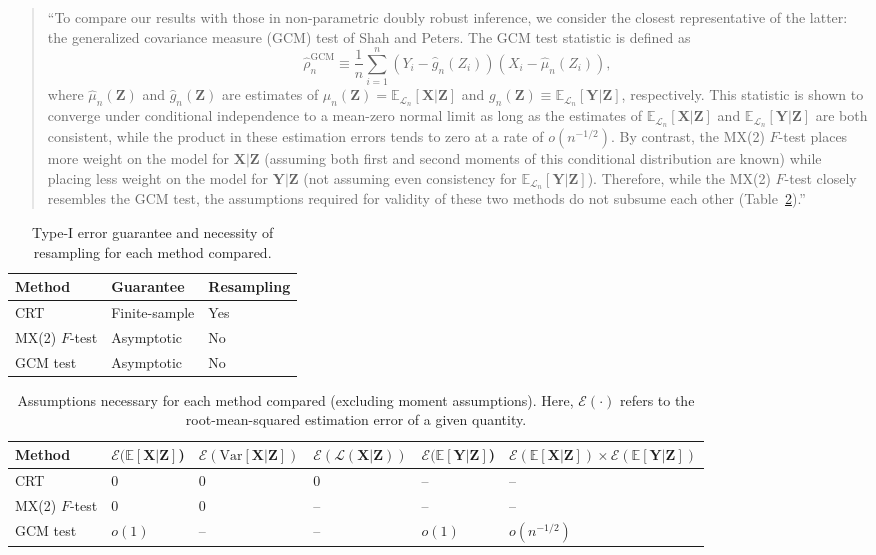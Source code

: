 \documentclass[12pt]{article}
\begin{document}
\begin{enumerate}
\begin{quote}
``To compare our results with those in non-parametric doubly robust inference, we consider the closest representative of the latter: the generalized covariance measure (GCM) test of Shah and Peters. The GCM test statistic is defined as
\begin{equation}
	\widehat \rho^{\text{GCM}}_n \equiv \frac{1}{n}\sum_{i = 1}^n  (Y_i - \widehat g_n(Z_i))(X_i - \widehat \mu_n(Z_i)),
\end{equation}
where $\widehat \mu_n(\bm Z)$ and $\widehat g_n(\bm Z)$ are estimates of $\mu_n(\bm Z) = \mathbb E_{\mathcal L_n}[\bm X|\bm Z]$ and $g_n(\bm Z) \equiv \mathbb E_{\mathcal L_n}[\bm Y|\bm Z]$, respectively. This statistic is shown to converge under conditional independence to a mean-zero normal limit as long as the estimates of $\mathbb E_{\mathcal L_n}[\bm X|\bm Z]$ and $\mathbb E_{\mathcal L_n}[\bm Y|\bm Z]$ are both consistent, while the product in these estimation errors tends to zero at a rate of $o(n^{-1/2})$. By contrast, the MX(2) $F$-test places more weight on the model for $\bm X|\bm Z$ (assuming both first and second moments of this conditional distribution are known) while placing less weight on the model for $\bm Y|\bm Z$ (not assuming even consistency for $\mathbb E_{\mathcal L_n}[\bm Y|\bm Z]$). Therefore, while the MX(2) $F$-test closely resembles the GCM test, the assumptions required for validity of these two methods do not subsume each other (Table~\ref{tab:summary-2}).''
\end{quote}

	\begin{table}[h!]
	\centering
	\begin{tabular}{l|ll}
		Method & Guarantee & Resampling \\
		\hline
		CRT & Finite-sample & Yes \\	
		MX(2) $F$-test & Asymptotic & No  \\
		GCM test & Asymptotic & No
	\end{tabular}
	\caption{Type-I error guarantee and necessity of resampling for each method compared.}
	\label{tab:summary-1}
\end{table}

\begin{table}[h!]
	\small
	\begin{tabular}{l|lllll}
		Method & $\mathcal E(\mathbb E[\bm X|\bm Z]$) & $\mathcal E(\text{Var}[\bm X|\bm Z])$ & $\mathcal E(\mathcal L(\bm X|\bm Z))$ & $\mathcal E(\mathbb E[\bm Y|\bm Z]$) & $\mathcal E(\mathbb E[\bm X|\bm Z]) \times \mathcal E(\mathbb E[\bm Y|\bm Z])$ \\
		\hline
		CRT & 0 & 0 & 0 & --& --  \\
		MX(2) $F$-test  & 0 & 0 & -- & -- & -- \\
		GCM test & $o(1)$ & -- & -- & $o(1)$ & $o(n^{-1/2})$
	\end{tabular}
	\caption{Assumptions necessary for each method compared (excluding moment assumptions). Here, $\mathcal E(\cdot)$ refers to the root-mean-squared estimation error of a given quantity.}
	\label{tab:summary-2}
\end{table}

\end{enumerate}
\end{document}
